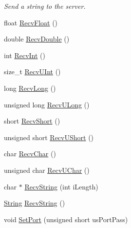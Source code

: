 \begin{DoxyCompactItemize}
\begin{DoxyCompactList}\small\item\em Send a string to the server. \end{DoxyCompactList}\item 
float \mbox{\hyperlink{class_rad_j_a_v_1_1_networking_1_1wx_widgets_t_c_p_client_accbbc7a429265395c0aaa0e55120ab36}{Recv\+Float}} ()
\item 
double \mbox{\hyperlink{class_rad_j_a_v_1_1_networking_1_1wx_widgets_t_c_p_client_a5fe45956f526465748febd1dfbf1a738}{Recv\+Double}} ()
\item 
int \mbox{\hyperlink{class_rad_j_a_v_1_1_networking_1_1wx_widgets_t_c_p_client_ad80311f3c9bfb5e6d3f432b4227bc65a}{Recv\+Int}} ()
\item 
size\+\_\+t \mbox{\hyperlink{class_rad_j_a_v_1_1_networking_1_1wx_widgets_t_c_p_client_ade7a4048aacdfac8a29b0936e1c87749}{Recv\+U\+Int}} ()
\item 
long \mbox{\hyperlink{class_rad_j_a_v_1_1_networking_1_1wx_widgets_t_c_p_client_a33ec446384ae86b928dfd92793f671af}{Recv\+Long}} ()
\item 
unsigned long \mbox{\hyperlink{class_rad_j_a_v_1_1_networking_1_1wx_widgets_t_c_p_client_a1ccd980056060e875f5cc680c91732e6}{Recv\+U\+Long}} ()
\item 
short \mbox{\hyperlink{class_rad_j_a_v_1_1_networking_1_1wx_widgets_t_c_p_client_a13eee779bf8281cadfa24f927dc02158}{Recv\+Short}} ()
\item 
unsigned short \mbox{\hyperlink{class_rad_j_a_v_1_1_networking_1_1wx_widgets_t_c_p_client_a80e785e8bf0473ab47f1dc906f0ac0b1}{Recv\+U\+Short}} ()
\item 
char \mbox{\hyperlink{class_rad_j_a_v_1_1_networking_1_1wx_widgets_t_c_p_client_a2c2ec4d4c31f46ad085ba5bde8645a53}{Recv\+Char}} ()
\item 
unsigned char \mbox{\hyperlink{class_rad_j_a_v_1_1_networking_1_1wx_widgets_t_c_p_client_a3b212a49fa6e35f2b15c7ed58b53188d}{Recv\+U\+Char}} ()
\item 
char $\ast$ \mbox{\hyperlink{class_rad_j_a_v_1_1_networking_1_1wx_widgets_t_c_p_client_a6bce2ed1b76426bbdc7fddc1c676fe57}{Recv\+String}} (int i\+Length)
\item 
\mbox{\hyperlink{class_rad_j_a_v_1_1_string}{String}} \mbox{\hyperlink{class_rad_j_a_v_1_1_networking_1_1wx_widgets_t_c_p_client_abd7b224de561ac1a90d1677df5243952}{Recv\+String}} ()
\item 
void \mbox{\hyperlink{class_rad_j_a_v_1_1_networking_1_1wx_widgets_t_c_p_client_a7a5b908897319073f06fac0a70859ce8}{Set\+Port}} (unsigned short us\+Port\+Pass)

\end{DoxyCompactItemize}

